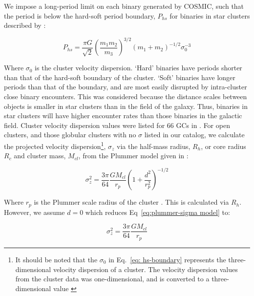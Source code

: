 \documentclass[twocolumn]{aastex63}
\begin{document}
We impose a long-period limit on each binary generated by COSMIC, such that the period is below the hard-soft period boundary, \textit{$P_{hs}$} for binaries in star clusters described by \citet{2015ApJ...808L..25G}:

\begin{equation} \label{eq: hs-boundary}
    P_{hs} = \frac{\pi G}{\sqrt{2}} \left( \frac{m_1m_2}{m_3} \right) ^{3/2}(m_1 + m_2)^{-1/2}\sigma_0^{-3}
\end{equation}

Where $\sigma_0$ is the cluster velocity dispersion. ‘Hard’ binaries have periods shorter than that of the hard-soft boundary of the cluster. ‘Soft’ binaries have longer periods than that of the boundary, and are most easily disrupted by intra-cluster close binary encounters. This was considered because the distance scales between objects is smaller in star clusters than in the field of the galaxy. Thus, binaries in star clusters will have higher encounter rates than those binaries in the galactic field. Cluster velocity dispersion values were listed for 66 GCs in \citet{1996AJ....112.1487H}. For open clusters, and those globular clusters with no $\sigma$ listed in our catalog, we calculate the projected velocity dispersion\footnote{It should be noted that the $\sigma_0$ in Eq.~\ref{eq: hs-boundary} represents the three-dimensional velocity dispersion of a cluster. The velocity dispersion values from the cluster data was one-dimensional, and is converted to a three-dimensional value \citep{2015ApJ...808L..25G}}, $\sigma_z$  via the half-mass radius, $R_h$, or core radius $R_c$ and cluster mass, $M_{cl}$, from the Plummer model given in \cite{1911MNRAS..71..460P}:

\begin{equation}
    \sigma_z^2 = \frac{3\pi}{64}\frac{GM_{cl}}{r_p}\left(1 + \frac{d^2}{r_p^2} \right)^{-1/2}
    \label{eq:plummer-sigma model}
\end{equation}

 Where $r_p$ is the Plummer scale radius of the cluster \citep{1911MNRAS..71..460P}. This is calculated via $R_h$. However, we assume $d=0$ which reduces Eq~\ref{eq:plummer-sigma model} to:
 
 \begin{equation}
    \sigma_z^2 = \frac{3\pi}{64}\frac{GM_{cl}}{r_p}
    \label{eq:plummer-sigma mode (simplified)l}
\end{equation}
 
\end{document}
